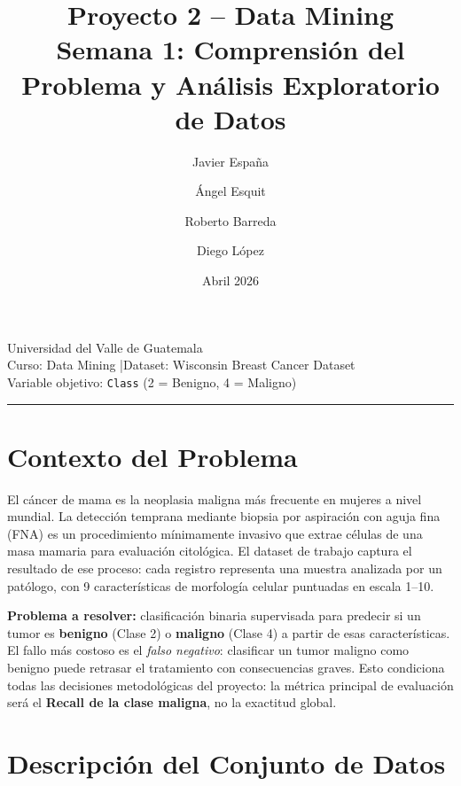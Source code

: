 \documentclass[11pt,a4paper]{article}
\title{\textbf{Proyecto 2 -- Data Mining}\\[0.4em]
       \large Semana 1: Comprensión del Problema y Análisis Exploratorio de Datos}
\author{Javier España \and Ángel Esquit \and Roberto Barreda \and Diego López}
\date{Abril 2026}
\begin{document}
\maketitle
\thispagestyle{empty}

\begin{center}
\large Universidad del Valle de Guatemala\\[0.2em]
\normalsize Curso: Data Mining \quad|\quad Dataset: Wisconsin Breast Cancer Dataset\\[0.2em]
Variable objetivo: \texttt{Class} \;(2 = Benigno, 4 = Maligno)
\end{center}

\vspace{0.5em}\hrule\vspace{0.5em}

\tableofcontents
\newpage

\section{Contexto del Problema}

El cáncer de mama es la neoplasia maligna más frecuente en mujeres a nivel mundial. La detección temprana mediante biopsia por aspiración con aguja fina (FNA) es un procedimiento mínimamente invasivo que extrae células de una masa mamaria para evaluación citológica. El dataset de trabajo captura el resultado de ese proceso: cada registro representa una muestra analizada por un patólogo, con 9 características de morfología celular puntuadas en escala 1--10.

\textbf{Problema a resolver:} clasificación binaria supervisada para predecir si un tumor es \textbf{benigno} (Clase 2) o \textbf{maligno} (Clase 4) a partir de esas características. El fallo más costoso es el \textit{falso negativo}: clasificar un tumor maligno como benigno puede retrasar el tratamiento con consecuencias graves. Esto condiciona todas las decisiones metodológicas del proyecto: la métrica principal de evaluación será el \textbf{Recall de la clase maligna}, no la exactitud global.

\section{Descripción del Conjunto de Datos}
\end{document}
